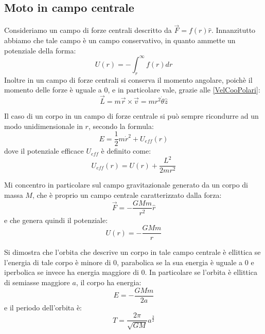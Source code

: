 \documentclass[../main.tex]{subfiles}
\begin{document}
\subsection{Moto in campo centrale}
Consideriamo un campo di forze centrali descritto da $\vec{F}=f(r)\hat{r}$. 
Innanzitutto abbiamo che tale campo è un campo conservativo, in quanto ammette un potenziale della forma:
\begin{equation*}
	U(r)=-\int_r^\infty{f(r) dr}
\end{equation*}
Inoltre in un campo di forze centrali si conserva il momento angolare, poichè il momento delle forze è uguale a 0,
e in particolare vale, grazie alle \cref{VelCooPolari}:
\begin{equation*}
	\vec{L}=m\vec{r}\times\vec{v}=mr^2\dot{\theta}\hat{z}
\end{equation*}

Il caso di un corpo in un campo di forze centrale si può sempre ricondurre ad un modo unidimensionale in $r$, secondo la formula:
\begin{equation}\label{CentraleUnidimensionale}
	E=\frac 12m\dot{r}^2+U_{eff}(r)
\end{equation}
dove il potenziale efficace $U_{eff}$ è definito come:
\begin{equation}\label{PotenzialeEfficace}
	U_{eff}(r)=U(r)+\frac{L^2}{2mr^2}
\end{equation}

Mi concentro in particolare sul campo gravitazionale generato da un corpo di massa $M$, che è proprio un campo 
centrale caratterizzato dalla forza:
\begin{equation*}
	\vec{F}=-\frac{GMm}{r^2}\hat{r}
\end{equation*}
e che genera quindi il potenziale:
\begin{equation*}
	U(r)=-\frac{GMm}{r}
\end{equation*}

Si dimostra che l'orbita che descrive un corpo in tale campo centrale è ellittica se l'energia di tale corpo è
minore di 0, parabolica se la sua energia è uguale a 0 e iperbolica se invece ha energia maggiore di 0.
In particolare se l'orbita è ellittica di semiasse maggiore $a$, il corpo ha energia:
\begin{equation} \label{EnergiaTotaleOrbita}
	E=-\frac{GMm}{2a}
\end{equation}
e il periodo dell'orbita è:
\begin{equation} \label{PeriodoOrbita}
	T=\frac{2\pi}{\sqrt{GM}}a^{\frac{3}{2}}
\end{equation}
\end{document}

